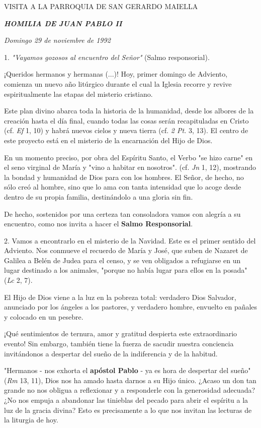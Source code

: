 VISITA A LA PARROQUIA DE SAN GERARDO MAIELLA

\emph{\textbf{HOMILIA DE JUAN PABLO II}}

\emph{Domingo 29 de noviembre de 1992}

1. \emph{"Vayamos gozosos al encuentro del Señor"} (Salmo responsorial).

¡Queridos hermanos y hermanas (...)! Hoy, primer domingo de Adviento,
comienza un nuevo año litúrgico durante el cual la Iglesia recorre y
revive espiritualmente las etapas del misterio cristiano.

Este plan divino abarca toda la historia de la humanidad, desde los
albores de la creación hasta el día final, cuando todas las cosas serán
recapituladas en Cristo (cf. \emph{Ef} 1, 10) y habrá nuevos cielos y
nueva tierra (cf. \emph{2 Pt.} 3, 13). El centro de este proyecto está
en el misterio de la encarnación del Hijo de Dios.

En un momento preciso, por obra del Espíritu Santo, el Verbo "se hizo
carne" en el seno virginal de María y "vino a habitar en nosotros". (cf.
\emph{Jn} 1, 12), mostrando la bondad y humanidad de Dios para con los
hombres. El Señor, de hecho, no sólo creó al hombre, sino que lo ama con
tanta intensidad que lo acoge desde dentro de su propia familia,
destinándolo a una gloria sin fin.

De hecho, sostenidos por una certeza tan consoladora vamos con alegría a
su encuentro, como nos invita a hacer el \textbf{Salmo Responsorial}.

2. Vamos a encontrarlo en el misterio de la Navidad. Este es el primer
sentido del Adviento. Nos conmueve el recuerdo de María y José, que
suben de Nazaret de Galilea a Belén de Judea para el censo, y se ven
obligados a refugiarse en un lugar destinado a los animales, "porque no
había lugar para ellos en la posada" (\emph{Lc} 2, 7).

El Hijo de Dios viene a la luz en la pobreza total: verdadero Dios
Salvador, anunciado por los ángeles a los pastores, y verdadero hombre,
envuelto en pañales y colocado en un pesebre.

¡Qué sentimientos de ternura, amor y gratitud despierta este
extraordinario evento! Sin embargo, también tiene la fuerza de sacudir
nuestra conciencia invitándonos a despertar del sueño de la indiferencia
y de la habitud.

"Hermanos - nos exhorta el \textbf{apóstol Pablo} - ya es hora de
despertar del sueño" (\emph{Rm} 13, 11), Dios nos ha amado hasta darnos
a su Hijo único. ¿Acaso un don tan grande no nos obligua a reflexionar y
a responderle con la generosidad adecuada? ¿No nos empuja a abandonar
las tinieblas del pecado para abrir el espíritu a la luz de la gracia
divina? Esto es precisamente a lo que nos invitan las lecturas de la
liturgia de hoy.


